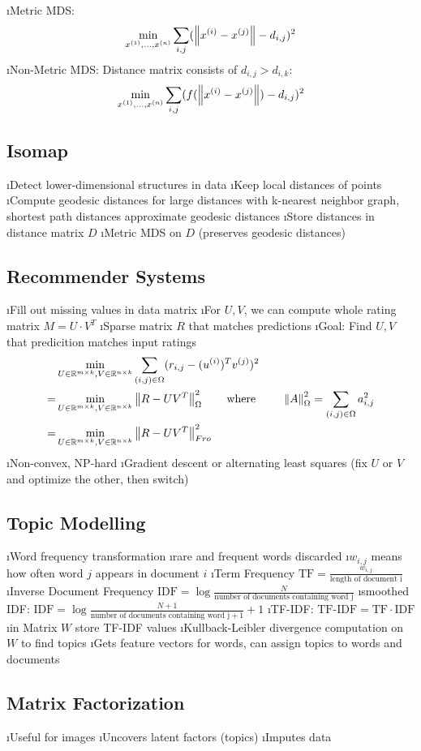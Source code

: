 
\bi
\i Metric MDS: \[\min_{x^{(1)}, \ldots, x^{(n)}} \displaystyle\sum_{i,j} ( \left\lVert x^{(i)} - x^{(j)}\right\rVert - d_{i,j})^2 \]
\i Non-Metric MDS: Distance matrix consists of $d_{i,j} > d_{i,k}$: \[\min_{x^{(1)}, \ldots, x^{(n)}} \displaystyle\sum_{i,j} ( f(\left\lVert x^{(i)} - x^{(j)}\right\rVert) - d_{i,j})^2\]
\ei

\subsection{Isomap}

\bi
\i Detect lower-dimensional structures in data
\i Keep local distances of points
\i Compute geodesic distances for large distances with k-nearest neighbor graph, shortest path distances approximate geodesic distances
\i Store distances in distance matrix $D$
\i Metric MDS on $D$ (preserves geodesic distances)
\ei

\subsection{Recommender Systems}

\bi
\i Fill out missing values in data matrix
\i For $U,V$, we can compute whole rating matrix $M = U \cdot V^T$
\i Sparse matrix $R$ that matches predictions
\i Goal: Find $U, V$ that predicition matches input ratings \begin{align*}
& \min_{U \in \mathbb{R}^{m \times k}, V \in \mathbb{R}^{n \times k}} \displaystyle\sum_{(i,j) \in \Omega} (r_{i,j} - (u^{(i)})^T v^{(j)})^2 \\
= & \min_{U \in \mathbb{R}^{m \times k}, V \in \mathbb{R}^{n \times k}} \left\lVert R - UV^T\right\rVert^2_{\Omega} \qquad \text{where } \qquad \left\lVert A\right\rVert_\Omega^2 = \displaystyle\sum_{(i,j) \in \Omega} a_{i,j}^2\\
= & \min_{U \in \mathbb{R}^{m \times k}, V \in \mathbb{R}^{n \times k}} \left\lVert R - UV^T\right\rVert^2_{Fro}
\end{align*}
\i Non-convex, NP-hard
\i Gradient descent or alternating least squares (fix $U$ or $V$ and optimize the other, then switch)
\ei

\subsection{Topic Modelling}

\bi
\i Word frequency transformation
\i rare and frequent words discarded
\i $w_{i,j}$ means how often word $j$ appears in document $i$
\i Term Frequency $\text{TF} = \frac{w_{i,j}}{\text{length of document i}}$
\i Inverse Document Frequency $\text{IDF} = \log \frac{N}{\text{number of documents containing word j}}$
\i smoothed IDF: $\text{IDF} = \log \frac{N+1}{\text{number of documents containing word j} + 1} + 1$
\i TF-IDF: $\text{TF-IDF} = \text{TF} \cdot \text{IDF}$
\i in Matrix $W$ store TF-IDF values
\i Kullback-Leibler divergence computation on $W$ to find topics
\i Gets feature vectors for words, can assign topics to words and documents
\ei

\subsection{Matrix Factorization}

\bi
\i Useful for images
\i Uncovers latent factors (topics)
\i Imputes data
\ei